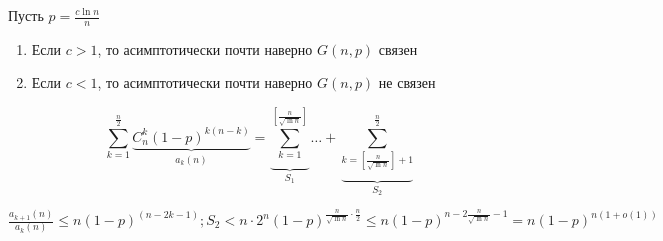 
\begin{reminder}
Пусть \(p = \frac{c \ln{n}}{n}\)
\begin{enumerate}
  \item Если \(c > 1\), то асимптотически почти наверно \(G(n, p)\) связен
  \item Если \(c < 1\), то асимптотически почти наверно \(G(n, p)\) не связен
\end{enumerate}
\end{reminder}

\[\sum_{k=1}^\frac{n}{2} \underbrace{C_n^k (1-p)^{k(n-k)}}_{a_k(n)} = \underbrace{\sum_{k=1}^{[\frac{n}{\sqrt{\ln{n}}}]}}_{S_1} \dots + \underbrace{\sum_{k = [\frac{n}{\sqrt{\ln{n}}}] + 1}^{\frac{n}{2}}}_{S_2}\]

\(\frac{a_{k+1}(n)}{a_k(n)} \le n (1-p)^{(n-2k-1)}; S_2 < n \cdot 2^n (1 - p)^{\frac{n}{\sqrt{\ln{n}}} \cdot \frac{n}{2}} \le n(1 - p)^{n - 2\frac{n}{\sqrt{\ln{n}}} - 1}  = n(1-p)^{n(1 + o(1))}\)